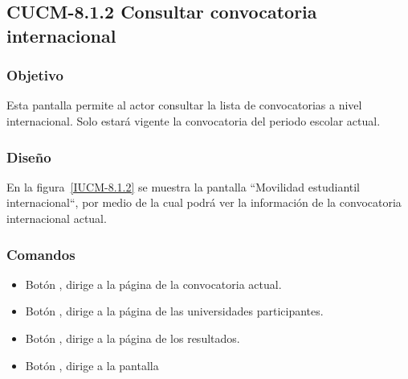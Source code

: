 \subsection{CUCM-8.1.2 Consultar convocatoria internacional}

\subsubsection{Objetivo}

Esta pantalla permite al actor  consultar la lista de convocatorias a nivel internacional. Solo estará vigente la convocatoria del periodo escolar actual.
\subsubsection{Diseño}

En la figura~\ref{IUCM-8.1.2} se muestra la pantalla ``Movilidad estudiantil internacional“, por medio de la cual podrá ver la información de la convocatoria internacional actual. \\


\subsubsection{Comandos}
\begin{itemize}
	\item Botón , dirige a la página de la convocatoria actual.
	\item Botón , dirige a la página de las universidades participantes.
	\item Botón , dirige a la página de los resultados.
	\item Botón , dirige a la pantalla 
\end{itemize}